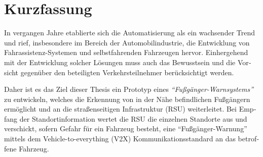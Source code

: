 \chapter{Kurzfassung}

\begin{german}
In vergangen Jahre etablierte sich die Automatisierung als ein wachsender Trend und rief, insbesondere im Bereich der Automobilindustrie, die Entwicklung von Fahrassistenz-Systemen und selbstfahrenden Fahrzeugen hervor. Einhergehend mit der Entwicklung solcher Lösungen muss auch das Bewusstsein und die Vorsicht gegenüber den beteiligten Verkehrsteilnehmer berücksichtigt werden.

Daher ist es das Ziel dieser Thesis ein Prototyp eines \textit{``Fußgänger-Warnsystems''} zu entwickeln, welches die Erkennung von in der Nähe befindlichen Fußgängern ermöglicht und an die straßenseitigen Infrastruktur (RSU) weiterleitet.
Bei Empfang der Standortinformation wertet die RSU die einzelnen Standorte aus und verschickt, sofern Gefahr für ein Fahrzeug besteht, eine ``Fußgänger-Warnung'' mittels dem Vehicle-to-everything (V2X) Kommunikationsstandard an das betroffene Fahrzeug.

\end{german}